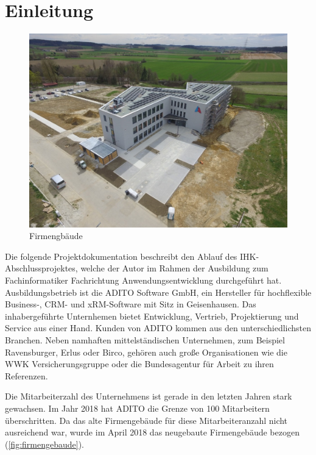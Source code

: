 \setcounter{page}{1}
\section{Einleitung}

\begin{figure}
	\vspace{-12px}
	\centering
	\includegraphics[width=1\linewidth]{../graphic/images/firma/Firmengebaude}
	\caption{Firmengbäude}
	\label{fig:firmengebaude}
\end{figure}

Die folgende Projektdokumentation beschreibt den Ablauf des IHK-Abschlussprojektes, welche der Autor im Rahmen der Ausbildung zum Fachinformatiker Fachrichtung Anwendungsentwicklung
durchgeführt hat. Ausbildungsbetrieb ist die ADITO Software GmbH, ein Hersteller für hochflexible Business-, CRM- und xRM-Software mit Sitz in Geisenhausen. Das inhabergeführte Unternhemen bietet Entwicklung, Vertrieb, Projektierung und Service aus einer Hand. Kunden von ADITO kommen aus den unterschiedlichsten Branchen. Neben namhaften mittelständischen Unternehmen, zum Beispiel Ravensburger, Erlus oder Birco, gehören auch große Organisationen wie die WWK Versicherungsgruppe oder die Bundesagentur für Arbeit zu ihren Referenzen.

Die Mitarbeiterzahl des Unternehmens ist gerade in den letzten Jahren stark gewachsen. Im Jahr 2018 hat ADITO die Grenze von 100 Mitarbeitern überschritten. Da das alte Firmengebäude für diese Mitarbeiteranzahl nicht ausreichend war, wurde im April 2018 das neugebaute Firmengebäude bezogen (\autoref{fig:firmengebaude}).

